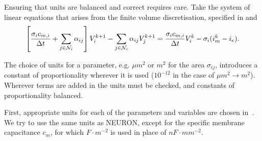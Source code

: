 Ensuring that units are balanced and correct requires care.
Take the system of linear equations that arises from the finite volume discretisation, specified in  and 
\begin{equation}
    \label{eq:linsys_FV}
    \left[
        \frac{\sigma_i c_{m,i}}{\Delta t} + \sum_{j\in\mathcal{N}_i} {\alpha_{ij}}
    \right]
    V_i^{k+1} - \sum_{j\in\mathcal{N}_i} { \alpha_{ij} V_j^{k+1}}
        =
    \frac{\sigma_i c_{m,i}}{\Delta t} V_i^k -  \sigma_i(i_m^{k} - i_e).
\end{equation}

The choice of units for a parameter, e.g. $\mu m^2$ or $m^2$ for the area $\sigma_{ij}$, introduces a constant of proportionality wherever it is used ($10^{-12}$ in the case of $\mu m^2 \rightarrow m^2$).
Wherever terms are added in  the units must be checked, and constants of proportionality balanced.

First, appropriate units for each of the parameters and variables are chosen in~.
We try to use the same units as NEURON, except for the specific membrane capacitance $c_m$, for which $F\cdot m^{-2}$ is used in place of $nF\cdot mm^{-2}$.

